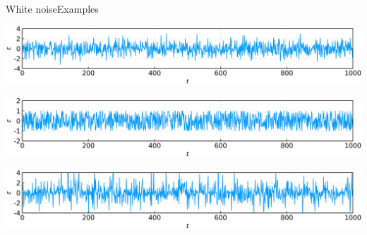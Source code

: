 \documentclass[usenames,dvipsnames,svgnames,10pt,aspectratio=169]{beamer}
\begin{document}
\begin{frame}[t, c]{White noise}{Examples}
	\centering

	\includegraphics[width=.8\textwidth]{gaussian_white_noise}


	\includegraphics[width=.8\textwidth]{uniform_white_noise}


	\includegraphics[width=.8\textwidth]{laplace_white_noise}

	\vspace{1cm}
\end{frame}
\end{document}
